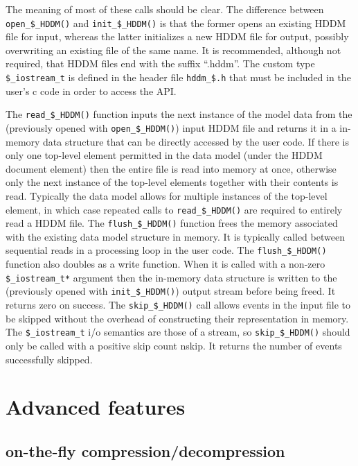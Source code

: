 \documentclass{revtex4}
\begin{document}
The meaning of most of these calls should be clear.  The difference between
\texttt{open\_\$\_HDDM()} and \texttt{init\_\$\_HDDM()} is that the former
opens an existing HDDM file for input, whereas the latter initializes a new
HDDM file for output, possibly overwriting an existing file of the same name.
It is recommended, although not required, that HDDM files end with the suffix
``.hddm''.  The custom type \texttt{\$\_iostream\_t} is defined in the 
header file \texttt{hddm\_\$.h} that must be included in the user's c
code in order to access the API.

The \texttt{read\_\$\_HDDM()} function inputs the next instance of the model
data from the (previously opened with \texttt{open\_\$\_HDDM()}) input HDDM
file and returns it in a
in-memory data structure that can be directly accessed by the user code.  If
there is only one top-level element permitted in the data model (under the
HDDM document element) then the entire file is read into memory at once,
otherwise only the next instance of the top-level elements together with their
contents is read. Typically the data
model allows for multiple instances of the top-level element, in which
case repeated calls to \texttt{read\_\$\_HDDM()} are required to entirely
read a HDDM file.   The \texttt{flush\_\$\_HDDM()} function frees
the memory associated with the existing data model structure in memory.
It is typically called between sequential reads in a processing loop
in the user code.  The \texttt{flush\_\$\_HDDM()} function also doubles
as a write function. When it is called with a non-zero 
\texttt{\$\_iostream\_t*} argument then the in-memory data
structure is written to the (previously opened with \texttt{init\_\$\_HDDM()})
output stream before being freed. It returns zero on success.
The \texttt{skip\_\$\_HDDM()} call allows events in the input 
file to be skipped without the overhead of constructing their
representation in memory.  The \texttt{\$\_iostream\_t}
i/o semantics are those of a stream, so \texttt{skip\_\$\_HDDM()}
should only be called with a positive skip count nskip.  It returns
the number of events successfully skipped.

\section{Advanced features}\label{Advanced_features}

\subsection{on-{}the-{}fly compression/decompression}
\end{document}
